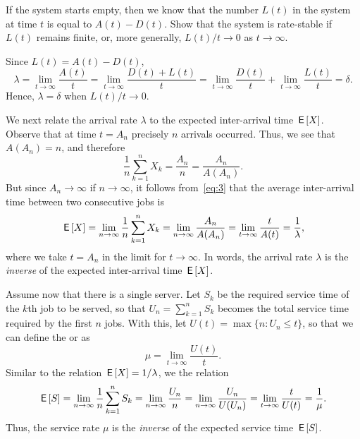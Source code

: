 \begin{exercise}
If the system starts empty, then we know that the number $L(t)$ in the system at time $t$ is equal to $A(t) - D(t)$.
Show that the system is rate-stable  if $L(t)$ remains finite, or, more generally, $L(t)/t \to 0$ as $t\to\infty$.
\begin{solution}
Since $L(t) = A(t) - D(t)$, 
\begin{equation*}
 \lambda = \lim_{t \to \infty} \frac{A(t)}t = \lim_{t \to \infty} \frac{D(t)+L(t)}t = \lim_{t \to \infty} \frac{D(t)}t + \lim_{t \to \infty} \frac{L(t)}t 
 = \delta. 
\end{equation*}
Hence, $\lambda=\delta$ when $L(t)/t\to0$.
\end{solution}
\end{exercise}


We next relate the arrival rate $\lambda$ to the expected inter-arrival time $\,\mathsf{E}\left[X\right]$.
Observe that at time $t=A_n$ precisely $n$ arrivals occurred.
Thus,
we see that $A(A_n) = n$, and therefore
\begin{equation*}
 \frac{1}n\sum_{k=1}^n X_k = \frac{A_n}n = \frac{A_n}{A(A_n)}. 
\end{equation*}
But since $A_n\to\infty$ if $n\to\infty$, it follows from~\cref{eq:3} that the average inter-arrival time between two consecutive jobs is
\begin{equation}\label{eq:54}
 \,\mathsf{E}\left[X\right] = \lim_{n\to\infty} \frac{1}n\sum_{k=1}^n X_k = \lim_{n\to \infty} \frac{A_n}{A(A_n)} = \lim_{t\to\infty} \frac t{A(t)} = \frac 1 \lambda,
\end{equation}
where we take $t=A_n$ in the limit for $t\to\infty$.
In words, the arrival rate $\lambda$ is the \emph{inverse} of the expected inter-arrival time $\,\mathsf{E}\left[X\right]$.


Assume now that there is a single server.
Let $S_k$ be the required service time of the $k$th job to be served, so that  $U_n = \sum_{k=1}^n S_k$ becomes the total service time required by the first $n$ jobs.
With this, let $ U(t) = \max\{n: U_n \leq t\}$, so that we can define the  or  as
\begin{equation*}
 \mu = \lim_{t\to\infty} \frac{U(t)}t.
\end{equation*}
Similar to the relation  $\,\mathsf{E}\left[X\right]= 1/\lambda$, we the relation
\begin{equation*}
 \,\mathsf{E}\left[S\right] = \lim_{n\to\infty} \frac 1 n \sum_{k=1}^n S_k = \lim_{n\to\infty} \frac{U_n}{n} = \lim_{n\to\infty} \frac{U_n}{U(U_n)} = \lim_{t\to\infty} \frac t{U(t)} = \frac 1 \mu.
\end{equation*}
Thus,  the service rate $\mu$ is the \emph{inverse} of the expected service time $\,\mathsf{E}\left[S\right]$.

